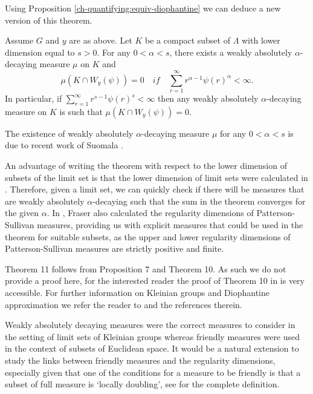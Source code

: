 Using Proposition \ref{ch-quantifying:equiv-diophantine} we can deduce a new version of this theorem.

\begin{theorem}
	Assume $G$ and $y$ are as above. Let $K$ be a compact subset of $\Lambda$ with lower dimension equal to $s > 0$. For any $0 < \alpha < s$, there exists a weakly absolutely $\alpha$-decaying measure $\mu$ on $K$ and 
	\[
	\mu(K\cap W_y(\psi)) = 0 \quad if \quad \sum_{r=1}^\infty r^{\alpha-1} \psi(r)^{\alpha} < \infty.
	\]
	In particular, if  $\sum_{r=1}^\infty r^{s-1} \psi(r)^{s} < \infty$ then any weakly absolutely $\alpha$-decaying measure on $K$ is such that $\mu(K\cap W_y(\psi)) = 0$.
\end{theorem}

The existence of weakly absolutely $\alpha$-decaying measure $\mu$ for any $0< \alpha < s$ is due to recent work of Suomala \cite[Theorem 4.1]{suomala}.

An advantage of writing the theorem with respect to the lower dimension of subsets of the limit set is that the lower dimension of limit sets were calculated in \cite{fraser2}. Therefore, given a limit set, we can quickly check if there will be measures that are weakly absolutely $\alpha$-decaying such that the sum in the theorem converges for the given $\alpha$. In \cite{fraser2}, Fraser also calculated the regularity dimensions of Patterson-Sullivan measures, providing us with explicit measures that could be used in the theorem for suitable subsets, as the upper and lower regularity dimensions of Patterson-Sullivan measures are strictly positive and finite. 

Theorem 11 follows from Proposition 7 and Theorem 10. As such we do not provide a proof here, for the interested reader the proof of Theorem 10 in \cite{beres-sanju-al} is very accessible. For further information on Kleinian groups and Diophantine approximation we refer the reader to \cite{beres-sanju-al, fraser2} and the references therein.

Weakly absolutely decaying measures were the correct measures to consider in the setting of limit sets of Kleinian groups whereas friendly measures were used in the context of subsets of Euclidean space. It would be a natural extension to study the links between friendly measures and the regularity dimensions, especially given that one of the conditions for a measure to be friendly is that a subset of full measure is `locally doubling', see \cite{friendly} for the complete definition.  

